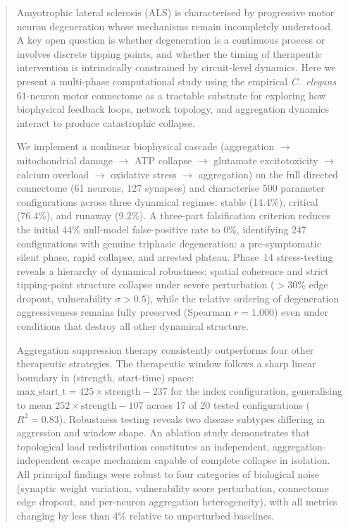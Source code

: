 \documentclass[12pt,a4paper]{article}
\begin{document}
\begin{abstract}
Amyotrophic lateral sclerosis (ALS) is characterised by progressive motor neuron degeneration
whose mechanisms remain incompletely understood. A key open question is whether degeneration is
a continuous process or involves discrete tipping points, and whether the timing of therapeutic
intervention is intrinsically constrained by circuit-level dynamics. Here we present a
multi-phase computational study using the empirical \textit{C.~elegans} 61-neuron motor
connectome as a tractable substrate for exploring how biophysical feedback loops, network
topology, and aggregation dynamics interact to produce catastrophic collapse.

We implement a nonlinear biophysical cascade (aggregation $\to$ mitochondrial damage $\to$ ATP
collapse $\to$ glutamate excitotoxicity $\to$ calcium overload $\to$ oxidative stress $\to$
aggregation) on the full directed connectome (61 neurons, 127 synapses) and characterise 500
parameter configurations across three dynamical regimes: stable (14.4\%), critical (76.4\%),
and runaway (9.2\%). A three-part falsification criterion reduces the initial 44\% null-model
false-positive rate to 0\%, identifying 247 configurations with genuine triphasic degeneration:
a pre-symptomatic silent phase, rapid collapse, and arrested plateau. Phase~14 stress-testing
reveals a hierarchy of dynamical robustness: spatial coherence and strict tipping-point
structure collapse under severe perturbation ($>$30\% edge dropout, vulnerability $\sigma>0.5$),
while the relative ordering of degeneration aggressiveness remains fully preserved (Spearman
$r=1.000$) even under conditions that destroy all other dynamical structure.

Aggregation suppression therapy consistently outperforms four other therapeutic strategies. The
therapeutic window follows a sharp linear boundary in (strength, start-time) space:
$\mathrm{max\_start\_t} = 425 \times \text{strength} - 237$ for the index configuration,
generalising to mean $252 \times \text{strength} - 107$ across 17 of 20 tested configurations
($R^2 = 0.83$). Robustness testing reveals two disease subtypes differing in aggression and
window shape. An ablation study demonstrates that topological load redistribution constitutes an
independent, aggregation-independent escape mechanism capable of complete collapse in isolation.
All principal findings were robust to four categories of biological noise (synaptic weight
variation, vulnerability score perturbation, connectome edge dropout, and per-neuron aggregation
heterogeneity), with all metrics changing by less than 4\% relative to unperturbed baselines.


\end{abstract}
\end{document}
